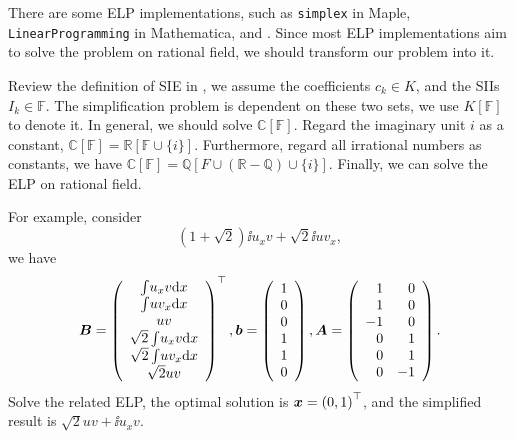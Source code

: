 There are some ELP implementations, such as \texttt{simplex} in Maple, \texttt{LinearProgramming} in Mathematica,  \citep{soplex} and  \citep{qsoptex}. Since most ELP implementations aim to solve the problem on rational field, we should transform our problem into it. 

Review the definition of SIE in , we assume the coefficients $c_k\in K$, and the SIIs $I_k\in \mathbb F$. The simplification problem is dependent on these two sets, we use $K[\mathbb F]$ to denote it. In general, we should solve $\mathbb C[\mathbb F]$. Regard the imaginary unit $i$ as a constant, $\mathbb C[\mathbb F]=\mathbb R[\mathbb F \cup \{i\}]$. Furthermore, regard all  irrational numbers as constants, we have $\mathbb C[\mathbb F]=\mathbb Q[F\cup (\mathbb R - \mathbb Q) \cup \{i\}]$. Finally, we can solve the ELP on rational field.

For example, consider
\begin{equation}
\left(1+\sqrt{2}\right)\ii{u_x v}+\sqrt{2}\ii{u v_x}, 
\end{equation}
we have
\begin{equation}
\bm{B}=\left(
\begin{array}{c}
\int\!{u_x v\mathrm{d}x}  \\
\int\!{u v_x\mathrm{d}x}  \\
u v         \\
\sqrt{2}\int\!{u_x v\mathrm{d}x}  \\
\sqrt{2}\int\!{u v_x\mathrm{d}x}  \\
\sqrt{2}u v         \\
\end{array}
\right)^\top,
\bm{b}=\left(
\begin{array}{c}
1   \\
0   \\
0   \\
1   \\
1   \\
0   \\
\end{array}
\right),
\bm{A}=\left(
\begin{array}{rr}
1   & 0\\
1   & 0\\
-1  & 0\\
0   & 1\\
0   & 1\\
0   & -1\\
\end{array}
\right).
\end{equation}
Solve the related ELP, the optimal solution is $\bm{x}=\left(0,1\right)^\top$, and the simplified result is $\sqrt{2}uv+\ii{u_x v}$. 

